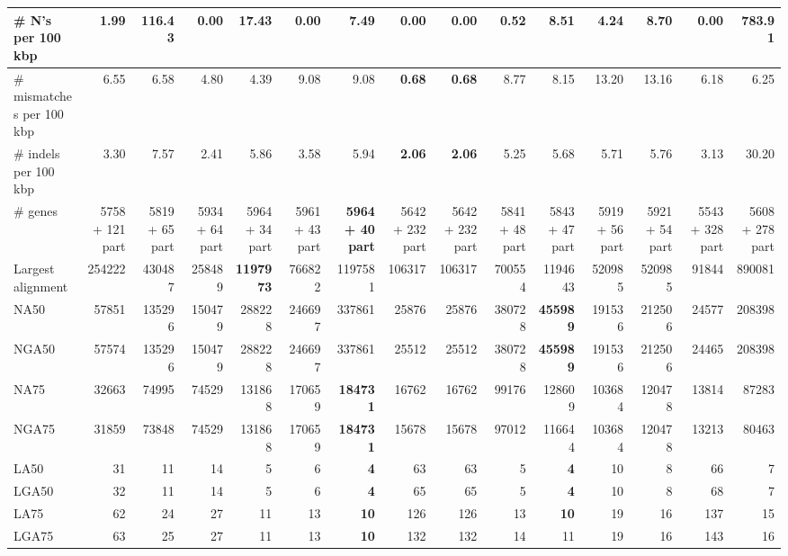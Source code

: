 \documentclass[12pt,a4paper]{article}
\begin{document}
\begin{table}[ht]
\begin{center}
\begin{tabular}{|l*{14}{|r}|}
\# N's per 100 kbp & 1.99 & 116.43 & {\bf 0.00} & 17.43 & {\bf 0.00} & 7.49 & {\bf 0.00} & {\bf 0.00} & 0.52 & 8.51 & 4.24 & 8.70 & {\bf 0.00} & 783.91 \\ \hline
\# mismatches per 100 kbp & 6.55 & 6.58 & 4.80 & 4.39 & 9.08 & 9.08 & {\bf 0.68} & {\bf 0.68} & 8.77 & 8.15 & 13.20 & 13.16 & 6.18 & 6.25 \\ \hline
\# indels per 100 kbp & 3.30 & 7.57 & 2.41 & 5.86 & 3.58 & 5.94 & {\bf 2.06} & {\bf 2.06} & 5.25 & 5.68 & 5.71 & 5.76 & 3.13 & 30.20 \\ \hline
\# genes & 5758 + 121 part & 5819 + 65 part & 5934 + 64 part & 5964 + 34 part & 5961 + 43 part & {\bf 5964 + 40 part} & 5642 + 232 part & 5642 + 232 part & 5841 + 48 part & 5843 + 47 part & 5919 + 56 part & 5921 + 54 part & 5543 + 328 part & 5608 + 278 part \\ \hline
Largest alignment & 254222 & 430487 & 258489 & {\bf 1197973} & 766822 & 1197581 & 106317 & 106317 & 700554 & 1194643 & 520985 & 520985 & 91844 & 890081 \\ \hline
NA50 & 57851 & 135296 & 150479 & 288228 & 246697 & 337861 & 25876 & 25876 & 380728 & {\bf 455989} & 191536 & 212506 & 24577 & 208398 \\ \hline
NGA50 & 57574 & 135296 & 150479 & 288228 & 246697 & 337861 & 25512 & 25512 & 380728 & {\bf 455989} & 191536 & 212506 & 24465 & 208398 \\ \hline
NA75 & 32663 & 74995 & 74529 & 131868 & 170659 & {\bf 184731} & 16762 & 16762 & 99176 & 128609 & 103684 & 120478 & 13814 & 87283 \\ \hline
NGA75 & 31859 & 73848 & 74529 & 131868 & 170659 & {\bf 184731} & 15678 & 15678 & 97012 & 116644 & 103684 & 120478 & 13213 & 80463 \\ \hline
LA50 & 31 & 11 & 14 & 5 & 6 & {\bf 4} & 63 & 63 & 5 & {\bf 4} & 10 & 8 & 66 & 7 \\ \hline
LGA50 & 32 & 11 & 14 & 5 & 6 & {\bf 4} & 65 & 65 & 5 & {\bf 4} & 10 & 8 & 68 & 7 \\ \hline
LA75 & 62 & 24 & 27 & 11 & 13 & {\bf 10} & 126 & 126 & 13 & {\bf 10} & 19 & 16 & 137 & 15 \\ \hline
LGA75 & 63 & 25 & 27 & 11 & 13 & {\bf 10} & 132 & 132 & 14 & 11 & 19 & 16 & 143 & 16 \\ \hline
\end{tabular}
\end{center}
\end{table}
\end{document}
